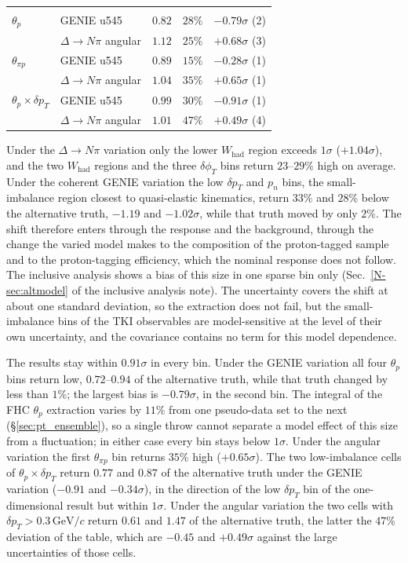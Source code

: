 \documentclass[11pt,a4paper]{article}
\newcommand{\GeVc}{\,\text{GeV}\!/c}
\newcommand{\noteref}[2]{#1~\ref{N-#2} of the inclusive analysis note}
\begin{document}
\begin{table}[H]
\begin{tabular}{llccc}
    \midrule
    \multicolumn{5}{l}{} \\
    $\theta_p$ & GENIE u545 & $0.82$ & $28\%$ & $-0.79\sigma$ (2) \\
                     & $\Delta\to N\pi$ angular & $1.12$ & $25\%$ & $+0.68\sigma$ (3) \\
    $\theta_{\pi p}$ & GENIE u545 & $0.89$ & $15\%$ & $-0.28\sigma$ (1) \\
                     & $\Delta\to N\pi$ angular & $1.04$ & $35\%$ & $+0.65\sigma$ (1) \\
    $\theta_p\times\delta p_T$ & GENIE u545 & $0.99$ & $30\%$ & $-0.91\sigma$ (1) \\
                     & $\Delta\to N\pi$ angular & $1.01$ & $47\%$ & $+0.49\sigma$ (4) \\
    \bottomrule
  \end{tabular}
\end{table}

Under the $\Delta\to N\pi$ variation only the lower $W_\mathrm{had}$ region exceeds $1\sigma$ ($+1.04\sigma$), and the two
$W_\mathrm{had}$ regions and the three $\delta\phi_T$ bins return $23$--$29\%$ high on average. Under the coherent GENIE
variation the low $\delta p_T$ and $p_n$ bins, the small-imbalance region closest to quasi-elastic
kinematics, return $33\%$ and $28\%$ below the alternative truth, $-1.19$ and $-1.02\sigma$, while that
truth moved by only $2\%$. The shift therefore enters through the response and the background, through the change
the varied model makes to the composition of the proton-tagged sample and to the proton-tagging
efficiency, which the nominal response does not follow. The inclusive analysis shows a bias of this
size in one sparse bin only (\noteref{Sec.}{sec:altmodel}). The uncertainty covers the shift at about
one standard deviation, so the extraction does not fail, but the small-imbalance bins of the TKI
observables are model-sensitive at the level of their own uncertainty, and the covariance contains no
term for this model dependence.

The  results stay within $0.91\sigma$ in every bin. Under the GENIE variation all
four $\theta_p$ bins return low, $0.72$--$0.94$ of the alternative truth, while that truth changed by
less than $1\%$; the largest bias is $-0.79\sigma$, in the second bin. The integral of the FHC $\theta_p$
extraction varies by $11\%$ from one pseudo-data set to the next (\S\ref{sec:pt_ensemble}), so a single
throw cannot separate a model effect of this size from a fluctuation; in either case every bin stays
below $1\sigma$. Under the angular variation the first $\theta_{\pi p}$ bin returns $35\%$ high
($+0.65\sigma$). The two low-imbalance cells of $\theta_p\times\delta p_T$ return $0.77$ and $0.87$ of the
alternative truth under the GENIE variation ($-0.91$ and $-0.34\sigma$), in the direction of the low
$\delta p_T$ bin of the one-dimensional result but within $1\sigma$. Under the angular variation the two cells
with $\delta p_T>0.3\GeVc$ return $0.61$ and $1.47$ of the alternative truth, the latter the $47\%$
deviation of the table, which are $-0.45$ and $+0.49\sigma$ against the large uncertainties of those cells.
\end{document}
